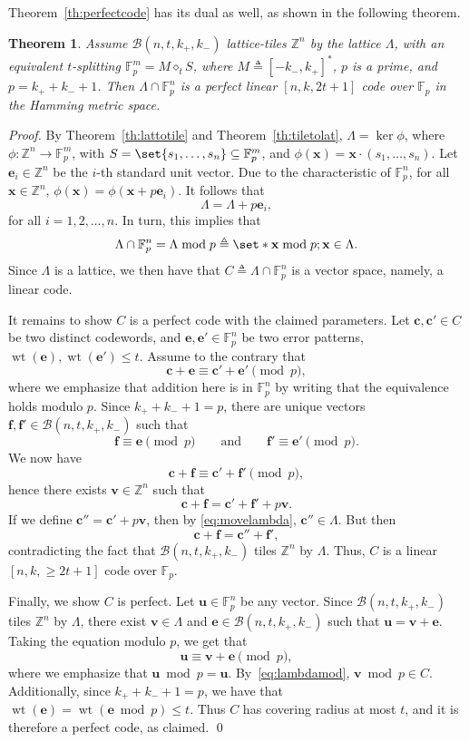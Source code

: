 \documentclass[sort&compress]{elsarticle}
\renewcommand{\leq}{\leqslant}
\renewcommand{\geq}{\geqslant}
\newtheorem{theorem}{Theorem}
\newcommand{\F}{\mathbb{F}}
\newcommand{\Z}{\mathbb{Z}}
\newcommand{\ve}{\mathbf{e}}
\newcommand{\vv}{\mathbf{v}}
\newcommand{\vu}{\mathbf{u}}
\newcommand{\vx}{\mathbf{x}}
\newcommand{\vc}{\mathbf{c}}
\newcommand{\vf}{\mathbf{f}}
\DeclareMathOperator{\wt}{wt}
\newcommand{\kp}{k_+}
\newcommand{\km}{k_-}
\newcommand{\BALL}{{\mathcal B}(n,t,\kp,\km)}
\newcommand{\eqdef}{\triangleq}
\newcommand{\splt}{\diamond}
\begin{document}
Theorem~\ref{th:perfectcode} has its dual as well, as shown in the
following theorem.

\begin{theorem}
  \label{th:revperfectcode}
  Assume $\BALL$ lattice-tiles $\Z^n$ by the lattice
  $\Lambda$, with an equivalent $t$-splitting $\F_p^m= M\splt_t S$,
  where $M\eqdef[-\km,\kp]^*$, $p$ is a prime, and $p=\kp+\km+1$. Then
  $\Lambda\cap\F_p^n$ is a perfect linear $[n,k,2t+1]$ code over
  $\F_p$ in the Hamming metric space.
\end{theorem}
\begin{proof}
  By Theorem~\ref{th:lattotile} and Theorem~\ref{th:tiletolat},
  $\Lambda=\ker\phi$, where $\phi:\Z^n\to\F_p^m$, with
  $S=\set{s_1,\dots,s_n}\subseteq\F_p^m$, and
  $\phi(\vx)=\vx\cdot(s_1,\dots,s_n)$. Let $\ve_i\in\Z^n$ be the
  $i$-th standard unit vector. Due to the characteristic of $\F_p^n$,
  for all $\vx\in\Z^n$, $\phi(\vx)=\phi(\vx+p\ve_i)$. It follows that
  \begin{equation}
    \label{eq:movelambda}
    \Lambda=\Lambda+p\ve_i,
  \end{equation}
  for all $i=1,2,\dots,n$. In turn, this implies that
  \begin{equation}
    \label{eq:lambdamod}
    \Lambda\cap\F_p^n = \Lambda\bmod p \eqdef \set*{\vx\bmod p ; \vx\in\Lambda}.
  \end{equation}
  Since $\Lambda$ is a lattice, we then have that $C\eqdef\Lambda\cap\F_p^n$
  is a vector space, namely, a linear code.

  It remains to show $C$ is a perfect code with the claimed
  parameters. Let $\vc,\vc'\in C$ be two distinct codewords, and
  $\ve,\ve'\in\F_p^n$ be two error patterns, $\wt(\ve),\wt(\ve')\leq
  t$. Assume to the contrary that
  \[\vc+\ve\equiv \vc'+\ve' \pmod{p},\]
  where we emphasize that addition here is in $\F_p^n$ by writing that
  the equivalence holds modulo $p$. Since $\kp+\km+1=p$, there are
  unique vectors $\vf,\vf'\in\BALL$ such that
  \[ \vf\equiv \ve\pmod{p} \qquad\text{and}\qquad \vf'\equiv\ve'\pmod{p}.\]
  We now have
  \[\vc+\vf\equiv \vc'+\vf' \pmod{p},\]
  hence there exists $\vv\in\Z^n$ such that
  \[\vc+\vf=\vc'+\vf'+p\vv.\]
  If we define $\vc''=\vc'+p\vv$, then by \eqref{eq:movelambda},
  $\vc''\in\Lambda$. But then
  \[ \vc+\vf=\vc''+\vf',\]
  contradicting the fact that $\BALL$ tiles $\Z^n$ by $\Lambda$. Thus,
  $C$ is a linear $[n,k,\geq 2t+1]$ code over $\F_p$.

  Finally, we show $C$ is perfect. Let $\vu\in\F_p^n$ be any
  vector. Since $\BALL$ tiles $\Z^n$ by $\Lambda$, there exist
  $\vv\in\Lambda$ and $\ve\in\BALL$ such that $\vu=\vv+\ve$. Taking
  the equation modulo $p$, we get that
  \[ \vu \equiv \vv+\ve \pmod{p},\]
  where we emphasize that $\vu\bmod p=\vu$. By~\eqref{eq:lambdamod},
  $\vv\bmod p\in C$. Additionally, since $\kp+\km+1=p$, we have that
  $\wt(\ve)=\wt(\ve\bmod p)\leq t$. Thus $C$ has covering radius at
  most $t$, and it is therefore a perfect code, as claimed.
  \qed\end{proof}
\end{document}
